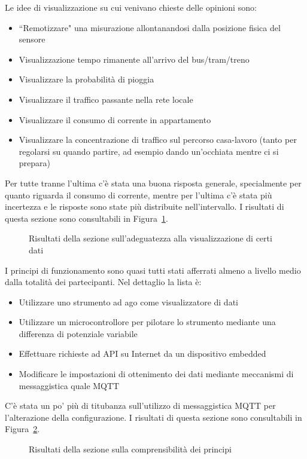 \documentclass[12pt,a4paper]{report}
\begin{document}
Le idee di visualizzazione su cui venivano chieste delle opinioni sono:
\begin{itemize}
  \item ``Remotizzare" una misurazione allontanandosi dalla posizione fisica del sensore
  \item Visualizzazione tempo rimanente all'arrivo del bus/tram/treno
  \item Visualizzare la probabilità di pioggia
  \item Visualizzare il traffico passante nella rete locale
  \item Visualizzare il consumo di corrente in appartamento
  \item Visualizzare la concentrazione di traffico sul percorso casa-lavoro (tanto per regolarsi su quando partire, ad esempio dando un'occhiata mentre ci si prepara)
\end{itemize}
Per tutte tranne l'ultima c'è stata una buona risposta generale, specialmente per quanto riguarda il consumo di corrente, mentre per l'ultima
c'è stata più incertezza e le risposte sono state più distribuite nell'intervallo. I risultati di questa sezione sono consultabili in
Figura~\ref{fig:adeguatezzavis}.
\begin{figure}[h]
  \centering
  \caption{Risultati della sezione sull'adeguatezza alla visualizzazione di certi dati}
  \label{fig:adeguatezzavis}
\end{figure}

I principi di funzionamento sono quasi tutti stati afferrati almeno a livello medio dalla totalità dei partecipanti. Nel dettaglio la lista è:
\begin{itemize}
  \item Utilizzare uno strumento ad ago come visualizzatore di dati
  \item Utilizzare un microcontrollore per pilotare lo strumento mediante una differenza di potenziale variabile
  \item Effettuare richieste ad API su Internet da un dispositivo embedded
  \item Modificare le impostazioni di ottenimento dei dati mediante meccanismi di messaggistica quale MQTT
\end{itemize}
C'è stata un po' più di titubanza sull'utilizzo di messaggistica MQTT per l'alterazione della configurazione.
I risultati di questa sezione sono consultabili in Figura~\ref{fig:comprensibilita}.
\begin{figure}[h]
  \centering
  \caption{Risultati della sezione sulla comprensibilità dei principi}
  \label{fig:comprensibilita}
\end{figure}
\end{document}

